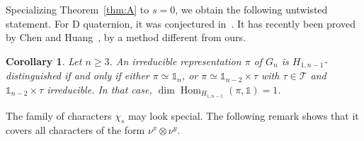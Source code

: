 \documentclass[11pt]{amsart}
\numberwithin{equation}{section}
\theoremstyle{plain}
\newtheorem{maincor}[mainthm]{Corollary}
\theoremstyle{definition}
\theoremstyle{remark}
\newtheorem{remark}[theorem]{Remark}
\newcommand{\one}{\mathds{1}}
\newcommand{\T}{\mathcal{T}}
\DeclareMathOperator{\Hom}{Hom}
\DeclareMathOperator{\Irr}{Irr}
\DeclareMathOperator{\Nrd}{Nrd}
\DeclareMathOperator{\St}{St}
\DeclareMathOperator{\Sp}{Sp}
\begin{document}
%

Specializing Theorem~\ref{thm:A} to $s=0$, we obtain the following untwisted statement. For $\mathrm{D}$ quaternion, it was conjectured in~\cite[Conjecture~1.1]{DSV27}. It has recently been proved by Chen and Huang~\cite[Theorem~A]{CH26}, by a method different from ours.

\begin{maincor}\label{cor:C}
	Let $n\ge3$. An irreducible representation $\pi$ of $G_n$ is $H_{1,n-1}$-distinguished if and only if either $\pi\simeq\one_n$, or $\pi\simeq\one_{n-2}\times\tau$ with $\tau\in\T$ and $\one_{n-2}\times\tau$ irreducible. In that case, $\dim\Hom_{H_{1,n-1}}(\pi,\one)=1$.
\end{maincor}

The family of characters $\chi_s$ may look special. The following remark shows that it covers all characters of the form $\nu^x\otimes\nu^y$.
\end{document}
